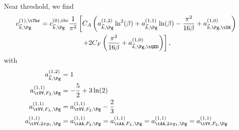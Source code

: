 Near threshold, we find
\begin{align}
c_{\vec k,\Pg}^{(1),\tThr} &= c_{\vec k,\Pg}^{(0),\text{thr}} \frac{1}{\pi^2}\left[
     C_A\left(a_{\vec k,\Pg}^{(1,2)}\ln^2(\beta) + a_{\vec k,\Pg}^{(1,1)}\ln(\beta) - \frac{\pi^2}{16\beta} + a_{\vec k,\Pg,\tOK}^{(1,0)}\right) \right. \nonumber\\
 &\hspace{60pt} \left. + 2C_F\left(\frac{\pi^2}{16\beta} + a_{\vec k,\Pg,\tQED}^{(1,0)}\right)\right],
\end{align}
with
\begin{align}
a^{(1,2)}_{\vec k,\Pg} &= 1\\
a^{(1,1)}_{\tVV,F_2,\Pg} &= -\frac 5 2 + 3\ln(2)\\
a^{(1,1)}_{\tVV,F_L,\Pg} &= a^{(1,1)}_{\tVV,F_2,\Pg} - \frac 2 3\\
a^{(1,1)}_{\tVV,2xg_1,\Pg} &= a^{(1,1)}_{\tAA,F_2,\Pg} = a^{(1,1)}_{\tAA,F_L,\Pg} = a^{(1,1)}_{\tAA,2xg_1,\Pg}= a^{(1,1)}_{\tVV,F_2,\Pg}
\end{align}
